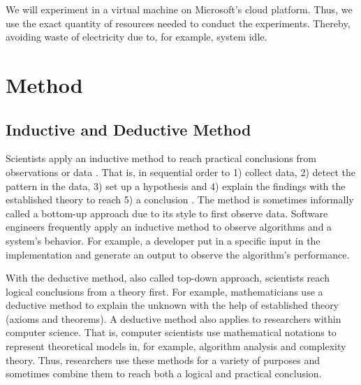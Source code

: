 \documentclass[a4paper,11pt]{kth-mag}
\newcommand*{\skippara}{\par\vspace{\baselineskip} \noindent}
\begin{document}
\skippara We will experiment in a virtual machine on Microsoft's cloud platform.
Thus, we use the exact quantity of resources needed to conduct the experiments.
Thereby, avoiding waste of electricity due to, for example, system idle.



\clearpage

%
\section{Method}\label{sec:methods}

\subsection{Inductive and Deductive Method}
Scientists apply an inductive method to reach practical conclusions from observations or data \cite{Omexperi69:online}.
That is, in sequential order to 1) collect data, 2) detect the pattern in the data, 3) set up a hypothesis and 4) explain the findings with the established theory to reach 5) a conclusion \cite{web:induction}.
The method is sometimes informally called a bottom-up approach due to its style to first observe data.
Software engineers frequently apply an inductive method to observe algorithms and a system's behavior.
For example, a developer put in a specific input in the implementation and generate an output to observe the algorithm's performance.

\skippara With the deductive method, also called top-down approach, scientists reach logical conclusions from a theory first.
For example, mathematicians use a deductive method to explain the unknown with the help of established theory (axioms and theorems).
A deductive method also applies to researchers within computer science.
That is, computer scientists use mathematical notations to represent theoretical models in, for example, algorithm analysis and complexity theory.
Thus, researchers use these methods for a variety of purposes and sometimes combine them to reach both a logical and practical conclusion.
\end{document}
